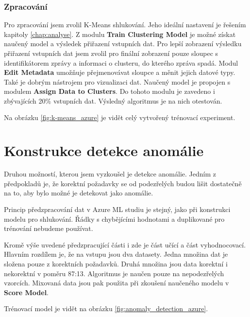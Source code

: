 \documentclass[thesis=M,czech]{FITthesis}[2012/10/20]
\begin{document}
		\subsubsection{Zpracování}
		Pro zpracování jsem zvolil K-Means shlukování. Jeho ideální nastavení je řešením kapitoly \ref{chap:analyse}. Z modulu \textbf{Train Clustering Model} je možné získat naučený model a výsledek přiřazení vstupních dat. Pro lepší zobrazení výsledku přiřazení vstupních dat jsem zvolil pro finální zobrazení pouze sloupec s identifikátorem zprávy a informaci o clusteru, do kterého zpráva spadá. Modul \textbf{Edit Metadata} umožňuje přejmenovávat sloupce a měnit jejich datové typy. Také je dobrým nástrojem pro vizualizaci dat. Naučený model je propojen s modulem \textbf{Assign Data to Clusters}. Do tohoto modulu je zavedeno i zbývajících 20\% vstupních dat. Výsledný algoritmus je na nich otestován.
		
		Na obrázku \ref{fig:k-means_azure} je vidět celý vytvořený trénovací experiment.
	
	\section{Konstrukce detekce anomálie}
		\label{sec:construc_anomaly}
		Druhou možností, kterou jsem vyzkoušel je detekce anomálie. Jedním z předpokladů je, že korektní požadavky se od podezřelých budou lišit dostatečně na to, aby bylo možné je detekovat jako anomálie.
		
		Princip předzpracování dat v Azure ML studiu je stejný, jako při konstrukci modelu pro shlukování. Řádky s chybějícími hodnotami a duplikované pro trénování nebudeme používat.
		
		Kromě výše uvedené předzpracující části i zde je část učící a část vyhodnocovací. Hlavním rozdílem je, že na vstupu jsou dva datasety. Jedna množina dat je složena pouze z korektních požadavků. Druhá množina jsou data korektní i nekorektní v poměru 87:13. Algoritmus je naučen pouze na nepodezřelých vzorcích. Mixovaná data jsou pak použita při zkoušení naučeného modelu v \textbf{Score Model}.
		
		Trénovací model je vidět na obrázku \ref{fig:anomaly_detection_azure}.
		
\end{document}
